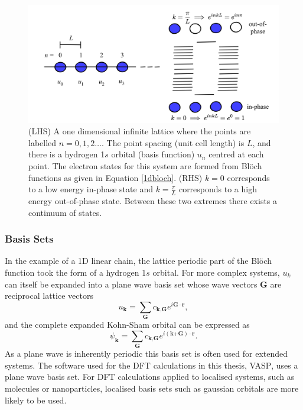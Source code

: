 \begin{figure}[h]
\centering
  \includegraphics[width=1.0\columnwidth]{figures/ch3/bands.png}
  \caption[In-phase and out-of-phase states in an infinite 1D crystal]{(LHS) A one dimensional infinite lattice where the points are labelled $n=0,1,2\ldots$. The point spacing (unit cell length) is $L$, and there is a hydrogen 1$s$ orbital (basis function) $u_n$ centred at each point. The electron states for this system are formed from Bl\"{o}ch functions as given in Equation \ref{1dbloch}. (RHS) $k=0$ corresponds to a low energy in-phase state and $k=\frac{\pi}{L}$ corresponds to a high energy out-of-phase state. Between these two extremes there exists a continuum of states.} 
  \label{bands}
\end{figure}

\subsubsection{Basis Sets}   %

In the example of a 1D linear chain, the lattice periodic part of the Bl\"{o}ch function took the form of a hydrogen 1$s$ orbital. For more complex systems, $u_k$ can itself be expanded into a plane wave basis set whose wave vectors $\textbf{G}$ are reciprocal lattice vectors
\begin{equation}
u_\textbf{k} = \sum_\textbf{G}c_{\textbf{k},\textbf{G}}e^{i\textbf{G}\cdot\textbf{r}},
\end{equation}
and the complete expanded Kohn-Sham orbital can be expressed as
\begin{equation} \label{KSeigenstates}
\psi_\textbf{k} = \sum_\textbf{G}c_{\textbf{k},\textbf{G}}e^{i(\textbf{k+G})\cdot\textbf{r}}.
\end{equation}
As a plane wave is inherently periodic this basis set is often used for extended systems. The software used for the DFT calculations in this thesis, \textsc{VASP}\autocite{Kresse1996}, uses a plane wave basis set. For DFT calculations applied to localised systems, such as molecules or nanoparticles, localised basis sets such as gaussian orbitals are more likely to be used.

